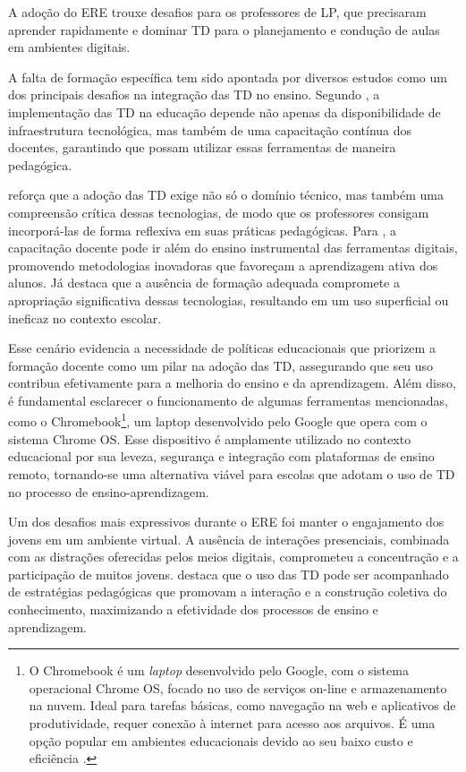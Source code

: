 \documentclass[portuguese]{textolivre}
\begin{document}
A adoção do ERE trouxe desafios para os professores de LP, que precisaram aprender rapidamente e dominar TD para o planejamento e condução de aulas em ambientes digitais.

A falta de formação específica tem sido apontada por diversos estudos como um dos principais desafios na integração das TD no ensino. Segundo \textcite[p. 52]{coscarelli2016}, a implementação das TD na educação depende não apenas da disponibilidade de infraestrutura tecnológica, mas também de uma capacitação contínua dos docentes, garantindo que possam utilizar essas ferramentas de maneira pedagógica.

\textcite{moran2015} reforça que a adoção das TD exige não só o domínio técnico, mas também uma compreensão crítica dessas tecnologias, de modo que os professores consigam incorporá-las de forma reflexiva em suas práticas pedagógicas. Para \textcite{kenski2012}, a capacitação docente pode ir além do ensino instrumental das ferramentas digitais, promovendo metodologias inovadoras que favoreçam a aprendizagem ativa dos alunos. Já \textcite{valente2019} destaca que a ausência de formação adequada compromete a apropriação significativa dessas tecnologias, resultando em um uso superficial ou ineficaz no contexto escolar.

Esse cenário evidencia a necessidade de políticas educacionais que priorizem a formação docente como um pilar na adoção das TD, assegurando que seu uso contribua efetivamente para a melhoria do ensino e da aprendizagem. Além disso, é fundamental esclarecer o funcionamento de algumas ferramentas mencionadas, como o Chromebook\footnote{O Chromebook é um \textit{laptop} desenvolvido pelo Google, com o sistema operacional Chrome OS, focado no uso de serviços on-line e armazenamento na nuvem. Ideal para tarefas básicas, como navegação na web e aplicativos de produtividade, requer conexão à internet para acesso aos arquivos. É uma opção popular em ambientes educacionais devido ao seu baixo custo e eficiência \cite{berredo2025}.}, um laptop desenvolvido pelo Google que opera com o sistema Chrome OS. Esse dispositivo é amplamente utilizado no contexto educacional por sua leveza, segurança e integração com plataformas de ensino remoto, tornando-se uma alternativa viável para escolas que adotam o uso de TD no processo de ensino-aprendizagem.

Um dos desafios mais expressivos durante o ERE foi manter o engajamento dos jovens em um ambiente virtual. A ausência de interações presenciais, combinada com as distrações oferecidas pelos meios digitais, comprometeu a concentração e a participação de muitos jovens. \textcite[p. 89]{moran2015} destaca que o uso das TD pode ser acompanhado de estratégias pedagógicas que promovam a interação e a construção coletiva do conhecimento, maximizando a efetividade dos processos de ensino e aprendizagem.
\end{document}
